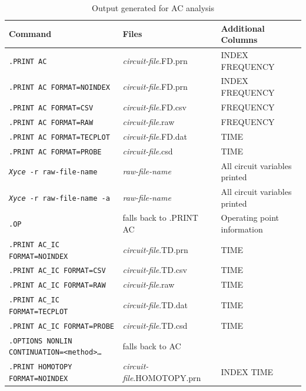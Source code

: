 \begin{table}[htbp]
  \caption{Output generated for AC analysis \label{AC_Output_table}}
  \begin{tabularx}{\linewidth}{|p{2.75in}|Y|Y|}
     \color{white}\textbf{Command} & \color{white}\textbf{Files} & \color{white}\textbf{Additional Columns} \\ \hline
\texttt{.PRINT AC} & \emph{circuit-file}.FD.prn & INDEX FREQUENCY \\ \hline
\texttt{.PRINT AC FORMAT=NOINDEX} & \emph{circuit-file}.FD.prn & INDEX FREQUENCY \\ \hline
\texttt{.PRINT AC FORMAT=CSV} & \emph{circuit-file}.FD.csv & FREQUENCY \\ \hline
\texttt{.PRINT AC FORMAT=RAW} & \emph{circuit-file}.raw & FREQUENCY \\ \hline
\texttt{.PRINT AC FORMAT=TECPLOT} & \emph{circuit-file}.FD.dat & TIME \\ \hline
\texttt{.PRINT AC FORMAT=PROBE} & \emph{circuit-file}.csd & TIME \\ \hline

\texttt{\emph{Xyce} -r raw-file-name} & \emph{raw-file-name} & All circuit variables printed \\ \hline
\texttt{\emph{Xyce} -r raw-file-name -a} & \emph{raw-file-name} & All circuit variables printed \\ \hline

\texttt{.OP}  & falls back to .PRINT AC & Operating point information \\ \hline
\texttt{.PRINT AC\_IC FORMAT=NOINDEX} & \emph{circuit-file}.TD.prn & TIME \\ \hline
\texttt{.PRINT AC\_IC FORMAT=CSV} & \emph{circuit-file}.TD.csv & TIME \\ \hline
\texttt{.PRINT AC\_IC FORMAT=RAW} & \emph{circuit-file}.raw & TIME \\ \hline
\texttt{.PRINT AC\_IC FORMAT=TECPLOT} & \emph{circuit-file}.TD.dat & TIME \\ \hline
\texttt{.PRINT AC\_IC FORMAT=PROBE} & \emph{circuit-file}.TD.csd & TIME \\ \hline

\texttt{.OPTIONS NONLIN CONTINUATION=<method>\ldots} & falls back to AC & \\ \hline
\texttt{.PRINT HOMOTOPY FORMAT=NOINDEX} & \emph{circuit-file}.HOMOTOPY.prn & INDEX TIME \\ \hline

  \end{tabularx}
\end{table}


